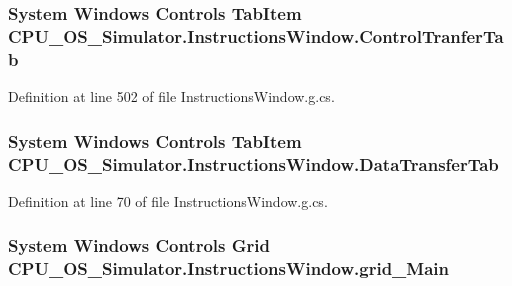 \subsubsection[{Control\+Tranfer\+Tab}]{\setlength{\rightskip}{0pt plus 5cm}System Windows Controls Tab\+Item C\+P\+U\+\_\+\+O\+S\+\_\+\+Simulator.\+Instructions\+Window.\+Control\+Tranfer\+Tab\hspace{0.3cm}{\ttfamily [package]}}\label{class_c_p_u___o_s___simulator_1_1_instructions_window_a52cb165b57f01928c088b3052de70b5b}


Definition at line 502 of file Instructions\+Window.\+g.\+cs.

\hypertarget{class_c_p_u___o_s___simulator_1_1_instructions_window_a1076ccccc5b00e3f34ad487bc99b509b}{}
\subsubsection[{Data\+Transfer\+Tab}]{\setlength{\rightskip}{0pt plus 5cm}System Windows Controls Tab\+Item C\+P\+U\+\_\+\+O\+S\+\_\+\+Simulator.\+Instructions\+Window.\+Data\+Transfer\+Tab\hspace{0.3cm}{\ttfamily [package]}}\label{class_c_p_u___o_s___simulator_1_1_instructions_window_a1076ccccc5b00e3f34ad487bc99b509b}


Definition at line 70 of file Instructions\+Window.\+g.\+cs.

\hypertarget{class_c_p_u___o_s___simulator_1_1_instructions_window_a83e86d19573c6c56db33e047354169a1}{}
\subsubsection[{grid\+\_\+\+Main}]{\setlength{\rightskip}{0pt plus 5cm}System Windows Controls Grid C\+P\+U\+\_\+\+O\+S\+\_\+\+Simulator.\+Instructions\+Window.\+grid\+\_\+\+Main\hspace{0.3cm}{\ttfamily [package]}}\label{class_c_p_u___o_s___simulator_1_1_instructions_window_a83e86d19573c6c56db33e047354169a1}


